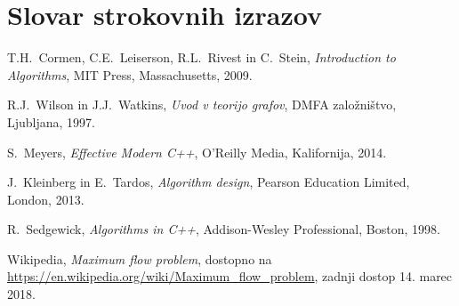 \documentclass[mat1]{fmfdelo}
\begin{document}
\newpage


\section*{Slovar strokovnih izrazov}



\begin{thebibliography}{99}

T.H.~Cormen, C.E.~Leiserson, R.L.~Rivest in C.~Stein, \emph{Introduction to Algorithms}, MIT Press, Massachusetts, 2009.

R.J.~Wilson in J.J.~Watkins, \emph{Uvod v teorijo grafov}, DMFA založništvo, Ljubljana, 1997.

S.~Meyers, \emph{Effective Modern C++}, O'Reilly Media, Kalifornija, 2014.

J.~Kleinberg in E.~Tardos, \emph{Algorithm design}, Pearson Education Limited, London, 2013.

R.~Sedgewick, \emph{Algorithms in C++}, Addison-Wesley Professional, Boston, 1998.

Wikipedia, \emph{Maximum flow problem}, dostopno na \url{https://en.wikipedia.org/wiki/Maximum_flow_problem}, zadnji dostop 14. marec 2018.

\end{thebibliography}
\end{document}
